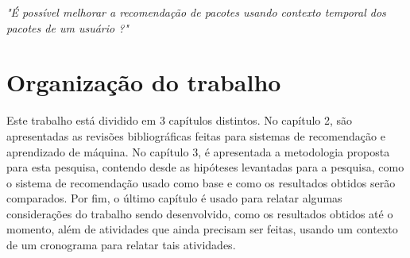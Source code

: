 \textit{"É possível melhorar a recomendação de pacotes usando contexto temporal
dos pacotes de um usuário ?"}

\section{Organização do trabalho}

Este trabalho está dividido em 3 capítulos distintos. No capítulo 2,
são apresentadas as revisões bibliográficas feitas para sistemas de recomendação e aprendizado de máquina.
No capítulo 3, é apresentada a metodologia proposta para esta pesquisa, contendo desde as hipóteses levantadas para a pesquisa,
 como o sistema de recomendação usado como base e como os resultados obtidos serão comparados. Por fim, o último capítulo é usado para relatar
algumas considerações do trabalho sendo desenvolvido, como os resultados obtidos até o momento, além de atividades que ainda precisam ser feitas,
usando um contexto de um cronograma para relatar tais atividades.
